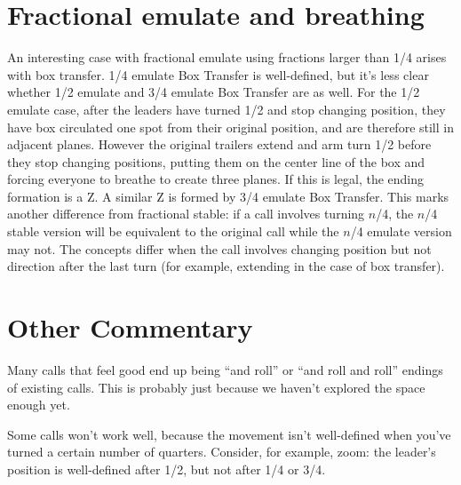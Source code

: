 \documentclass[11pt]{article}
\begin{document}
\section{Fractional emulate and breathing}

An interesting case with fractional emulate using fractions larger
than 1/4 arises with box transfer. 1/4 emulate Box Transfer is
well-defined, but it's less clear whether 1/2 emulate and 3/4 emulate
Box Transfer are as well. For the 1/2 emulate case, after the leaders
have turned 1/2 and stop changing position, they have box circulated
one spot from their original position, and are therefore still in
adjacent planes. However the original trailers extend and arm turn 1/2
before they stop changing positions, putting them on the center line
of the box and forcing everyone to breathe to create three planes. If
this is legal, the ending formation is a Z. A similar Z is formed by
3/4 emulate Box Transfer. This marks another difference from
fractional stable: if a call involves turning $n$/4, the $n$/4 stable
version will be equivalent to the original call while the $n$/4
emulate version may not. The concepts differ when the call involves
changing position but not direction after the last turn (for example,
extending in the case of box transfer).




\section{Other Commentary}

Many calls that feel good end up being ``and roll'' or ``and roll and
roll'' endings of existing calls.  This is probably just because we
haven't explored the space enough yet.

Some calls won't work well, because the movement isn't well-defined
when you've turned a certain number of quarters.  Consider, for
example, zoom: the leader's position is well-defined after 1/2, but
not after 1/4 or 3/4.
\end{document}
